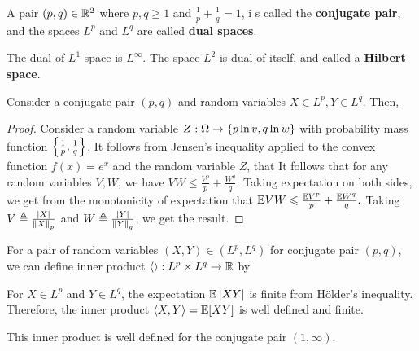 \documentclass[letterpaper,10pt,english]{article}
\begin{document}
\begin{defn}
A pair $(p,q) \in \mathbb{R}^2$ where $p, q \ge 1$ and $\frac{1}{p}+\frac{1}{q} = 1$, i
s called the \textbf{conjugate pair}, 
and the spaces $L^p$ and $L^q$ are called \textbf{dual spaces}. 
\end{defn}
\begin{shaded}
\begin{exmp}
The dual of $L^1$ space is $L^\infty$. 
The space $L^2$ is dual of itself, and called a \textbf{Hilbert space}. 
\end{exmp}
\end{shaded}
\begin{thm} 
Consider a conjugate pair $(p,q)$ and random variables $X \in L^p, Y \in L^q$. 
Then, 
\end{thm}
\begin{proof}
Consider a random variable $Z: \Omega \to \left\{p\ln v, q \ln w\right\}$ with probability mass function $\left\{\frac{1}{p}, \frac{1}{q}\right\}$. 
It follows from Jensen's inequality applied to the convex function $f(x) = e^x$ and the random variable $Z$, that 
It follows that for any random variables $V,W$, we have $VW \le \frac{V^p}{p} + \frac{W^q}{q}$. 
Taking expectation on both sides, 
we get from the monotonicity of expectation that  
$
\mathbb{E} VW \leqslant \frac{\mathbb{E} V^p}{p} +\frac{\mathbb{E} W^q}{q}.
$
Taking $V \triangleq \frac{\left\lvert X\right\rvert}{\left\lVert X\right\rVert_p}$ and $W \triangleq \frac{\left\lvert Y\right\rvert}{\left\lVert Y\right\rVert_q}$, we get the result.
\end{proof}
\begin{defn}
For a pair of random variables $(X,Y) \in (L^p,L^q)$ for conjugate pair $(p,q)$, 
we can define inner product $\left\langle \right\rangle:L^p\times L^q \to \mathbb{R}$ by 
\end{defn}
\begin{rem}
For $X \in L^p$ and $Y\in L^q$, the expectation $\mathbb{E}\left\lvert XY\right\rvert$ is finite from H\"older's inequality.
Therefore, the inner product $\left\langle X,Y\right\rangle = \mathbb{E}[XY]$ is well defined and finite.
\end{rem}
\begin{rem}
This inner product is well defined for the conjugate pair $(1,\infty)$.
\end{rem}
\end{document}

